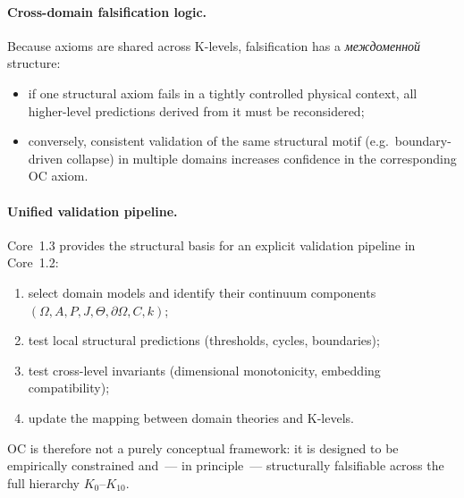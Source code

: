 \paragraph{Cross-domain falsification logic.}
Because axioms are shared across K-levels, falsification has a
\emph{междоменной} structure:
\begin{itemize}
  \item if one structural axiom fails in a tightly controlled physical
        context, all higher-level predictions derived from it must be
        reconsidered;
  \item conversely, consistent validation of the same structural motif
        (e.g.\ boundary-driven collapse) in multiple domains increases
        confidence in the corresponding OC axiom.
\end{itemize}

\paragraph{Unified validation pipeline.}
Core~1.3 provides the structural basis for an explicit validation pipeline
in Core~1.2:
\begin{enumerate}
  \item select domain models and identify their continuum components
        \((\Omega, A, P, J, \Theta, \partial\Omega, C, k)\);
  \item test local structural predictions (thresholds, cycles, boundaries);
  \item test cross-level invariants (dimensional monotonicity,
        embedding compatibility);
  \item update the mapping between domain theories and K-levels.
\end{enumerate}

OC is therefore not a purely conceptual framework: it is designed to be
empirically constrained and~— in principle~— structurally falsifiable across
the full hierarchy \(K_0\)–\(K_{10}\).

